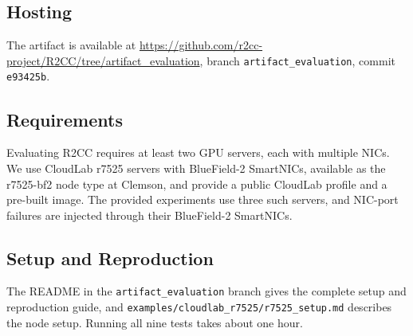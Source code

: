 \subsection*{Hosting}

The artifact is available at \url{https://github.com/r2cc-project/R2CC/tree/artifact_evaluation}, branch \texttt{artifact\_evaluation}, commit \texttt{e93425b}.

\subsection*{Requirements}
Evaluating R2CC requires at least two GPU servers, each with multiple NICs. We use CloudLab r7525 servers with BlueField-2 SmartNICs, available as the r7525-bf2 node type at Clemson, and provide a public CloudLab profile and a pre-built image. The provided experiments use three such servers, and NIC-port failures are injected through their BlueField-2 SmartNICs.

\subsection*{Setup and Reproduction}

The README in the \texttt{artifact\_evaluation} branch gives the complete setup and reproduction guide, and \texttt{examples/cloudlab\_r7525/r7525\_setup.md} describes the node setup. Running all nine tests takes about one hour.
